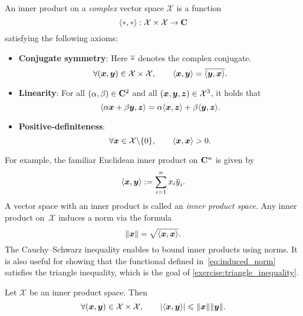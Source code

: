 \begin{definition}
    An inner product on a \emph{complex} vector space $\mathcal X$ is a function
    \[
        \ip{\placeholder,\placeholder}: \mathcal X \times \mathcal X \to \complex
    \]
    satisfying the following axioms:
    \begin{itemize}
        \item
            \textbf{Conjugate symmetry}:
            Here $\overline \placeholder$ denotes the complex conjugate.
            \[
                \forall (\mathbf{\boldsymbol{x}}, \mathbf{\boldsymbol{y}}) \in \mathcal X \times \mathcal X, \qquad
                \langle\mathbf{\boldsymbol{x}}, \mathbf{\boldsymbol{y}}\rangle = \overline{\langle\mathbf{\boldsymbol{y}}, \mathbf{\boldsymbol{x}}\rangle}.
            \]
        \item
            \textbf{Linearity}:
            For all $(\alpha, \beta) \in \mathbf C^2$ and all $(\mathbf{\boldsymbol{x}}, \mathbf{\boldsymbol{y}}, \mathbf{\boldsymbol{z}}) \in \mathcal X^3$,
            it holds that
            \[
                \langle\alpha \mathbf{\boldsymbol{x}} + \beta \mathbf{\boldsymbol{y}}, \mathbf{\boldsymbol{z}}\rangle
                = \alpha \langle\mathbf{\boldsymbol{x}}, \mathbf{\boldsymbol{z}}\rangle + \beta \langle\mathbf{\boldsymbol{y}}, \mathbf{\boldsymbol{z}}\rangle.
            \]

        \item
            \textbf{Positive-definiteness}:
            \[
                \forall \mathbf{\boldsymbol{x}} \in \mathcal X \backslash \{0\}, \qquad
                \langle\mathbf{\boldsymbol{x}}, \mathbf{\boldsymbol{x}}\rangle > 0.
            \]
    \end{itemize}
\end{definition}
For example, the familiar Euclidean inner product on $\mathbf C^n$ is given by
\[
    \langle\mathbf{\boldsymbol{x}}, \mathbf{\boldsymbol{y}}\rangle := \sum_{i=1}^{n} x_i \overline y_i.
\]
A vector space with an inner product is called an \emph{inner product space}.
Any inner product on~$\mathcal X$ induces a norm via the formula
\begin{equation}
    \label{eq:induced_norm}%
    \norm{\vect x} = \sqrt{\ip{\vect x, \vect x}}.
\end{equation}
The Cauchy--Schwarz inequality enables to bound inner products using norms.
It is also useful for showing that the functional defined in~\eqref{eq:induced_norm} satisfies the triangle inequality,
which is the goal of \cref{exercise:triangle_inequality}.
\begin{proposition}
    \label{proposition:cauchy_shwartz}
    Let $\mathcal X$ be an inner product space.
    Then
    \begin{equation}
        \label{eq:cauchy_shwartz}
        \forall  (\vect x, \vect y) \in \mathcal X \times \mathcal X, \qquad
        \abs[big]{\ip{\vect x, \vect y}} \leq \norm{\vect x} \norm{\vect y}.
    \end{equation}
\end{proposition}
